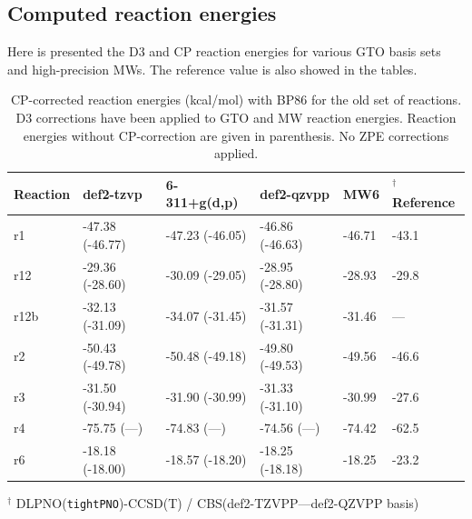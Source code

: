 \documentclass[11pt,a4paper]{article}
\begin{document}
	\subsection{Computed reaction energies}
	Here is presented the D3 and CP reaction energies for various GTO basis sets and high-precision MWs. The reference value\parencite{dohm2018} is also showed in the tables.
	
	\begin{table}[H]
		\centering
		\label{tab: rxn energies old bp86}
		\caption{CP-corrected reaction energies (\si{kcal/mol}) with BP86 for the old set of reactions. D3 corrections have been applied to GTO and MW reaction energies. Reaction energies without CP-correction are given in parenthesis. No ZPE corrections applied.}
		\begin{threeparttable}
		\begin{tabular}{l l l l l l }
			\toprule
			Reaction & def2-tzvp       & 6-311+g(d,p)    & def2-qzvpp      & MW6    & $^\dagger$Reference \parencite{dohm2018} \\ \midrule
			r1       & -47.38 (-46.77) & -47.23 (-46.05) & -46.86 (-46.63) & -46.71 & -43.1                          \\
			r12      & -29.36 (-28.60) & -30.09 (-29.05) & -28.95 (-28.80) & -28.93 & -29.8                          \\
			r12b     & -32.13 (-31.09) & -34.07 (-31.45) & -31.57 (-31.31) & -31.46 & ---                               \\
			r2       & -50.43 (-49.78) & -50.48 (-49.18) & -49.80 (-49.53) & -49.56 & -46.6                          \\
			r3       & -31.50 (-30.94) & -31.90 (-30.99) & -31.33 (-31.10) & -30.99 & -27.6                          \\
			r4       & -75.75 (---)    & -74.83 (---)    & -74.56 (---)    & -74.42 & -62.5                          \\
			r6       & -18.18 (-18.00) & -18.57 (-18.20) & -18.25 (-18.18) & -18.25 & -23.2                          \\ \bottomrule
		\end{tabular}
\begin{tablenotes}
	\item $^\dagger$ DLPNO(\verb|tightPNO|)-CCSD(T) / CBS(def2-TZVPP---def2-QZVPP basis)
\end{tablenotes}

\end{threeparttable}
	\end{table}
\end{document}
